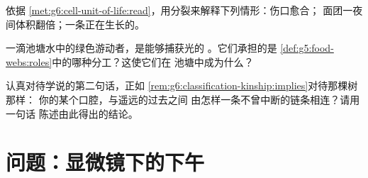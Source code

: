 \begin{exercise}[$\star\star$]\label{exo:g6:cell-unit-of-life:10}
依据
\cref{met:g6:cell-unit-of-life:read}，用分裂来解释下列情形：伤口愈合；
面团一夜间体积翻倍；一条正在生长的。
\end{exercise}

\begin{exercise}[$\star\star$]\label{exo:g6:cell-unit-of-life:11}
一滴池塘水中的绿色游动者，是能够捕获光的
  。它们承担的是
\cref{def:g5:food-webs:roles}中的哪种分工？这使它们在
池塘中成为什么？
\end{exercise}

\begin{exercise}[$\star\star\star$]\label{exo:g6:cell-unit-of-life:12}
认真对待学说的第二句话，正如
\cref{rem:g6:classification-kinship:implies}对待那棵树那样：
你的某个口腔，与遥远的过去之间
由怎样一条不曾中断的链条相连？请用一句话
陈述由此得出的结论。
\end{exercise}

\section{问题：显微镜下的下午}

